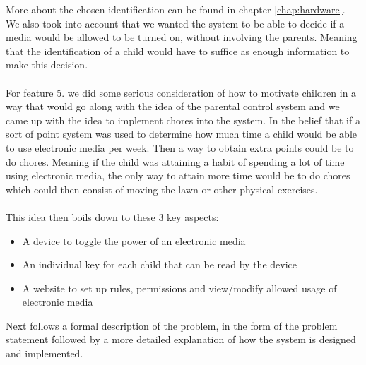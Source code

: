 More about the chosen identification can be found in chapter \vref{chap:hardware}.\\
We also took into account that we wanted the system to be able to decide if a media would be allowed to be turned on, without involving the parents. Meaning that the identification of a child would have to suffice as enough information to make this decision.\\
\\
For feature 5. we did some serious consideration of how to motivate children in a way that would go along with the idea of the parental control system and we came up with the idea to implement chores into the system. In the belief that if a sort of point system was used to determine how much time a child would be able to use electronic media per week. Then a way to obtain extra points could be to do chores. Meaning if the child was attaining a habit of spending a lot of time using electronic media, the only way to attain more time would be to do chores which could then consist of moving the lawn or other physical exercises.\\
\\
This idea then boils down to these 3 key aspects:

\begin{itemize}
	\item A device to toggle the power of an electronic media
	\item An individual key for each child that can be read by the device
	\item A website to set up rules, permissions and view/modify allowed usage of electronic media
\end{itemize} 

Next follows a formal description of the problem, in the form of the problem statement followed by a more detailed explanation of how the system is designed and implemented.
